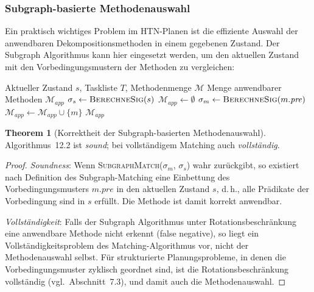 ﻿\documentclass[a4paper,12pt]{article}
\theoremstyle{definition}
\newtheorem{theorem}{Theorem}[section]
\begin{document}
\subsubsection{Subgraph-basierte Methodenauswahl}

Ein praktisch wichtiges Problem im HTN-Planen ist die effiziente Auswahl der anwendbaren Dekompositionsmethoden in einem gegebenen Zustand. Der Subgraph Algorithmus kann hier eingesetzt werden, um den aktuellen Zustand mit den Vorbedingungsmustern der Methoden zu vergleichen:

\begin{algorithm}[H]
  \caption{Subgraph-basierte HTN-Methodenauswahl}
  \begin{algorithmic}[1]
    \Eingabe Aktueller Zustand $s$, Taskliste $T$, Methodenmenge $\mathcal{M}$
    \Ausgabe Menge anwendbarer Methoden $\mathcal{M}_{\mathit{app}}$
      \State $\sigma_s \gets \textsc{BerechneSig}(s)$ 
      \State $\mathcal{M}_{\mathit{app}} \gets \emptyset$
        \State $\sigma_m \gets \textsc{BerechneSig}(m.\mathit{pre})$
          \State $\mathcal{M}_{\mathit{app}} \gets \mathcal{M}_{\mathit{app}} \cup \{m\}$
        \EndeWenn
      \EndeFuer
      \State \Return $\mathcal{M}_{\mathit{app}}$
    \EndProzedur
  \end{algorithmic}
\end{algorithm}

{\sloppy\begin{theorem}[Korrektheit der Subgraph-basierten Methodenauswahl]
Algorithmus~12.2 ist \emph{sound}; bei vollständigem Matching auch \emph{vollständig}.
\end{theorem}}\par

\begin{proof}
\textit{Soundness}: Wenn \textsc{SubgraphMatch}($\sigma_m$, $\sigma_s$) wahr zurückgibt, so existiert nach Definition des Subgraph-Matching eine Einbettung des Vorbedingungsmusters $m.\mathit{pre}$ in den aktuellen Zustand $s$, d.\,h., alle Prädikate der Vorbedingung sind in $s$ erfüllt. Die Methode ist damit korrekt anwendbar.

\textit{Vollständigkeit}: Falls der Subgraph Algorithmus unter Rotationsbeschränkung eine anwendbare Methode nicht erkennt (false negative), so liegt ein Vollständigkeitsproblem des Matching-Algorithmus vor, nicht der Methodenauswahl selbst. Für strukturierte Planungsprobleme, in denen die Vorbedingungsmuster zyklisch geordnet sind, ist die Rotationsbeschränkung vollständig (vgl.\ Abschnitt~7.3), und damit auch die Methodenauswahl.
\end{proof}
\end{document}
